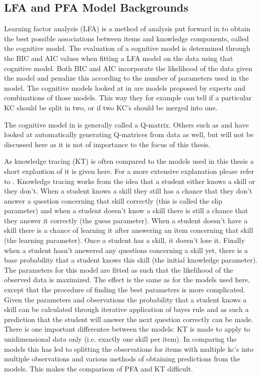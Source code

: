 \documentclass{scrartcl}
\begin{document}
\subsection{LFA and PFA Model Backgrounds}
Learning factor analysis (LFA) is a method of analysis put forward in \cite{lfa} to obtain the best possible associations between items and knowledge components, called the cognitive model. The evaluation of a cognitive model is determined through the BIC and AIC values when fitting a LFA model on the data using that cognitive model. Both BIC and AIC incorporate the likelihood of the data given the model and penalize this according to the number of parameters used in the model. The cognitive models looked at in \cite{lfa} are models proposed by experts and combinations of those models. This way they for example can tell if a particular KC should be split in two, or if two KC's should be merged into one.

The cognitive model in \cite{lfa} is generally called a Q-matrix. Others such as \cite{qm1} and \cite{qm2} have looked at automatically generating Q-matrices from data as well, but will not be discussed here as it is not of importance to the focus of this thesis.

As knowledge tracing (KT) is often compared to the models used in this thesis a short explantion of it is given here. For a more extensive explanation please refer to \cite{kt}. Knowledge tracing works from the idea that a student either knows a skill or they don't. When a student knows a skill they still has a chance that they don't answer a question concerning that skill correctly (this is called the slip parameter) and when a student doesn't know a skill there is still a chance that they answer it correctly (the guess parameter). When a student doesn't have a skill there is a chance of learning it after answering an item concerning that skill (the learning parameter). Once a student has a skill, it doesn't lose it. Finally when a student hasn't answered any questions concerning a skill yet, there is a base probability that a student knows this skill (the initial knowledge parameter). The parameters for this model are fitted as such that the likelihood of the observed data is maximized. The effect is the same as for the models used here, except that the procedure of finding the best parameters is more complicated. Given the parameters and observations the probability that a student knows a skill can be calculated through iterative application of bayes rule and as such a prediction that the student will answer the next question correctly can be made. There is one important differentce between the models: KT is made to apply to unidimensional data only (i.e. exactly one skill per item). In comparing the models this has led to splitting the observations for items with multiple kc's into multiple observations and various methods of obtaining predictions from the models. This makes the comparison of PFA and KT difficult.
\end{document}
